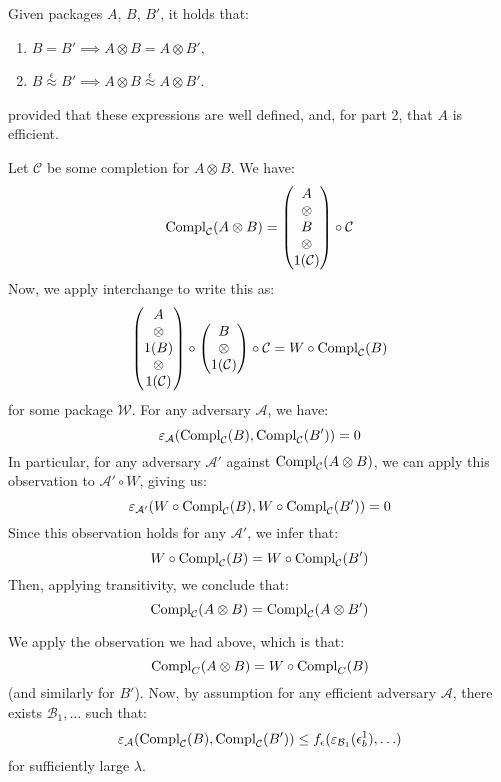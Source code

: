 \begin{lemma}
    \label{thm:pack_tensoring_respect}
    Given packages $A$, $B$, $B'$, it holds that:
    \begin{enumerate}
        \item $B = B' \implies A \otimes B = A \otimes B'$,
        \item $B \overset{\epsilon}{\approx} B' \implies A \otimes B \overset{\epsilon}{\approx} A \otimes B'$.
    \end{enumerate}
    provided that these expressions are well defined,
    and, for part 2, that $A$ is efficient.


    Let $\mathcal{C}$ be some completion for $A \otimes B$.
    We have:
    $$
    \text{Compl}_{\mathcal{C}}(A \otimes B)
    =
    \begin{pmatrix}
        A\cr
        \otimes\cr
        B\cr
        \otimes\cr
        1(\mathcal{C})
    \end{pmatrix}
    \circ \mathcal{C}
    $$
    Now, we apply interchange to write this as:
    $$
    \begin{pmatrix}
        A\cr
        \otimes\cr
        1(B)\cr
        \otimes\cr
        1(\mathcal{C})
    \end{pmatrix}
    \circ
    \begin{pmatrix}
        B\cr
        \otimes\cr
        1(\mathcal{C})
    \end{pmatrix}
    \circ \mathcal{C}
    = W \circ \text{Compl}_{\mathcal{C}}(B)
    $$
    for some package $\mathcal{W}$.
    For any adversary $\mathcal{A}$, we have:
    $$
    \varepsilon_{\mathcal{A}}(\text{Compl}_{\mathcal{C}}(B), \text{Compl}_{\mathcal{C}}(B')) = 0
    $$
    In particular, for any adversary $\mathcal{A}'$ against $\text{Compl}_{\mathcal{C}}(A \otimes B)$,
    we can apply this observation to $\mathcal{A}' \circ W$, giving us:
    $$
    \varepsilon_{\mathcal{A}'}(W \circ \text{Compl}_{\mathcal{C}}(B), W \circ \text{Compl}_{\mathcal{C}}(B')) = 0
    $$
    Since this observation holds for any $\mathcal{A}'$, we infer that:
    $$
    W \circ \text{Compl}_{\mathcal{C}}(B) =
    W \circ \text{Compl}_{\mathcal{C}}(B')
    $$
    Then, applying transitivity, we conclude that:
    $$
    \text{Compl}_{\mathcal{C}}(A \otimes B) =
    \text{Compl}_{\mathcal{C}}(A \otimes B')
    $$

     We apply the observation we had above, which is that:
    $$
    \text{Compl}_{C}(A \otimes B) = W \circ \text{Compl}_C(B)
    $$
    (and similarly for $B'$). 
    Now, by assumption
    for any efficient adversary $\mathcal{A}$, there exists $\mathcal{B}_1, \ldots$ such that:
    $$
    \varepsilon_{\mathcal{A}}(\text{Compl}_{\mathcal{C}}(B), \text{Compl}_{\mathcal{C}}(B')) \leq f_\epsilon(\varepsilon_{\mathcal{B}_1}(\epsilon^1_b), \ldots)
    $$
    for sufficiently large $\lambda$.


\end{lemma}
